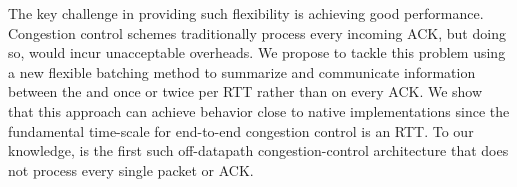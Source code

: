 The key challenge in providing such flexibility is achieving good performance. 
Congestion control schemes traditionally process every incoming ACK, but doing so, \ccp would incur unacceptable overheads. 
We propose to tackle this problem using a new flexible batching method to summarize and communicate information between the \datapath and \ccp{} once or twice per RTT rather than on every ACK\@. 
We show that this approach can achieve behavior close to native \datapath
implementations since the fundamental time-scale for end-to-end congestion control is an RTT\@. 
To our knowledge, \ccp{} is the first such off-datapath congestion-control architecture that does not process every single packet or ACK\@. 
